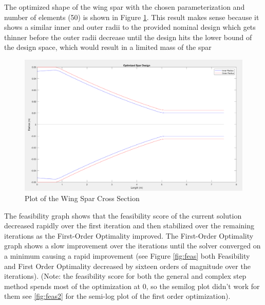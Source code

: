 \documentclass[11pt]{article}%
\begin{document}
The optimized shape of the wing spar with the chosen parameterization and number of elements (50) is shown in Figure \ref{fig:cross}. This result makes sense because it shows a similar inner and outer radii to the provided nominal design which gets thinner before the outer radii decrease until the design hits the lower bound of the design space, which would result in a limited mass of the spar

\begin{figure}[h!]
    \centering
    \includegraphics[width=0.75\linewidth]{fmiconoutput.png}
    \caption{ Plot of the Wing Spar Cross Section }
    \label{fig:cross}
\end{figure}
\newpage
The feasibility graph shows that the feasibility score of the current solution decreased rapidly over the first iteration and then stabilized over the remaining iterations as the First-Order Optimality improved. The First-Order Optimality graph shows a slow improvement over the iterations until the solver converged on a minimum causing a rapid improvement (see Figure \ref{fig:feas} both Feasibility and First Order Optimality decreased by sixteen orders of magnitude over the iterations). (Note: the feasibility score for both the general and complex step method spends most of the optimization at 0, so the semilog plot didn't work for them see \ref{fig:feas2} for the semi-log plot of the first order optimization).
\end{document}
